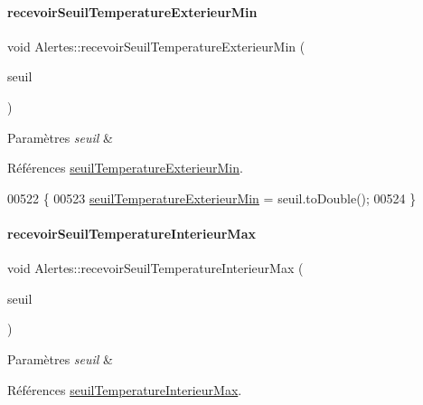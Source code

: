 \paragraph{\texorpdfstring{recevoir\+Seuil\+Temperature\+Exterieur\+Min}{recevoirSeuilTemperatureExterieurMin}}
{\footnotesize\ttfamily void Alertes\+::recevoir\+Seuil\+Temperature\+Exterieur\+Min (\begin{DoxyParamCaption}\item[{Q\+String}]{seuil }\end{DoxyParamCaption})\hspace{0.3cm}{\ttfamily [slot]}}


\begin{DoxyParams}{Paramètres}
{\em seuil} & \\
\hline
\end{DoxyParams}


Références \hyperlink{class_alertes_a0898c501edf5f07ac503b31b8a3d2454}{seuil\+Temperature\+Exterieur\+Min}.


\begin{DoxyCode}
00522 \{
00523     \hyperlink{class_alertes_a0898c501edf5f07ac503b31b8a3d2454}{seuilTemperatureExterieurMin} = seuil.toDouble();
00524 \}
\end{DoxyCode}
\mbox{\label{class_alertes_a06b136f1e86ca97978187305a11be0ff}} 
\paragraph{\texorpdfstring{recevoir\+Seuil\+Temperature\+Interieur\+Max}{recevoirSeuilTemperatureInterieurMax}}
{\footnotesize\ttfamily void Alertes\+::recevoir\+Seuil\+Temperature\+Interieur\+Max (\begin{DoxyParamCaption}\item[{Q\+String}]{seuil }\end{DoxyParamCaption})\hspace{0.3cm}{\ttfamily [slot]}}


\begin{DoxyParams}{Paramètres}
{\em seuil} & \\
\hline
\end{DoxyParams}


Références \hyperlink{class_alertes_abeda87298576a3b3eefcca9a96b8a0a9}{seuil\+Temperature\+Interieur\+Max}.


